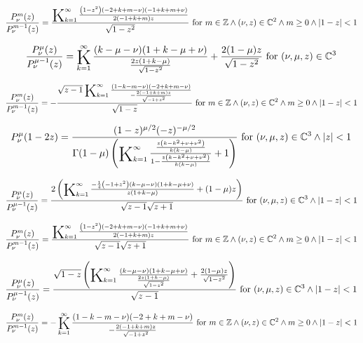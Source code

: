 \documentclass{article}
\newcommand{\bigK}{\mathop{\raisebox{-5pt}{\huge K}}}
\begin{document}
\[\frac{P_{\nu }^m(z)}{P_{\nu }^{m-1}(z)}=\frac{\bigK_{k=1}^{\infty}\frac{\left(1-z^2\right) (-2+k+m-\nu ) (-1+k+m+\nu )}{2 (-1+k+m) z}}{\sqrt{1-z^2}}\text{ for }m\in \mathbb{Z}\land (\nu ,z)\in \mathbb{C}^2\land m\geq 0\land \left| 1-z\right| <1\] 

\[\frac{P_{\nu }^{\mu }(z)}{P_{\nu }^{\mu -1}(z)}=\bigK_{k=1}^{\infty}\frac{(k-\mu -\nu ) (1+k-\mu +\nu )}{\frac{2 z (1+k-\mu )}{\sqrt{1-z^2}}}+\frac{2 (1-\mu ) z}{\sqrt{1-z^2}}\text{ for }(\nu ,\mu ,z)\in \mathbb{C}^3\] 

\[\frac{P_{\nu }^m(z)}{P_{\nu }^{m-1}(z)}=-\frac{\sqrt{z-1} \bigK_{k=1}^{\infty}\frac{(1-k-m-\nu ) (-2+k+m-\nu )}{-\frac{2 (-1+k+m) z}{\sqrt{-1+z^2}}}}{\sqrt{1-z}}\text{ for }m\in \mathbb{Z}\land (\nu ,z)\in \mathbb{C}^2\land m\geq 0\land \left| 1-z\right| <1\] 

\[P_{\nu }^{\mu }(1-2 z)=\frac{(1-z)^{\mu /2} (-z)^{-\mu /2}}{\Gamma (1-\mu ) \left(\bigK_{k=1}^{\infty}\frac{\frac{z \left(k-k^2+\nu +\nu ^2\right)}{k (k-\mu )}}{1-\frac{z \left(k-k^2+\nu +\nu ^2\right)}{k (k-\mu )}}+1\right)}\text{ for }(\nu ,\mu ,z)\in \mathbb{C}^3\land \left| z\right| <1\] 

\[\frac{P_{\nu }^{\mu }(z)}{P_{\nu }^{\mu -1}(z)}=\frac{2 \left(\bigK_{k=1}^{\infty}\frac{-\frac{1}{4} \left(-1+z^2\right) (k-\mu -\nu ) (1+k-\mu +\nu )}{z (1+k-\mu )}+(1-\mu ) z\right)}{\sqrt{z-1} \sqrt{z+1}}\text{ for }(\nu ,\mu ,z)\in \mathbb{C}^3\land \left| 1-z\right| <1\] 

\[\frac{P_{\nu }^m(z)}{P_{\nu }^{m-1}(z)}=\frac{\bigK_{k=1}^{\infty}\frac{\left(1-z^2\right) (-2+k+m-\nu ) (-1+k+m+\nu )}{2 (-1+k+m) z}}{\sqrt{z-1} \sqrt{z+1}}\text{ for }m\in \mathbb{Z}\land (\nu ,z)\in \mathbb{C}^2\land m\geq 0\land \left| 1-z\right| <1\] 

\[\frac{P_{\nu }^{\mu }(z)}{P_{\nu }^{\mu -1}(z)}=\frac{\sqrt{1-z} \left(\bigK_{k=1}^{\infty}\frac{(k-\mu -\nu ) (1+k-\mu +\nu )}{\frac{2 z (1+k-\mu )}{\sqrt{1-z^2}}}+\frac{2 (1-\mu ) z}{\sqrt{1-z^2}}\right)}{\sqrt{z-1}}\text{ for }(\nu ,\mu ,z)\in \mathbb{C}^3\land \left| 1-z\right| <1\] 

\[\frac{P_{\nu }^m(z)}{P_{\nu }^{m-1}(z)}=-\bigK_{k=1}^{\infty}\frac{(1-k-m-\nu ) (-2+k+m-\nu )}{-\frac{2 (-1+k+m) z}{\sqrt{-1+z^2}}}\text{ for }m\in \mathbb{Z}\land (\nu ,z)\in \mathbb{C}^2\land m\geq 0\land \left| 1-z\right| <1\] 
\end{document}
